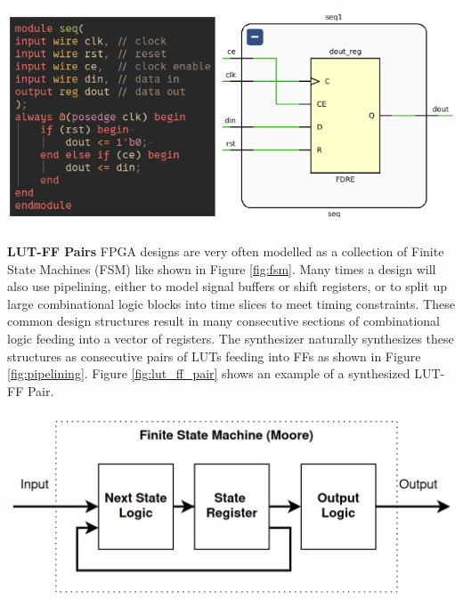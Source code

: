 \documentclass{article}
\begin{document}
\begin{multicols}{2}
        {
            \centering
            \includegraphics[width=\columnwidth]{figures/ff_synthesis.png}
            \label{fig:ff_synthesis}
        }

    \textbf{LUT-FF Pairs} \quad
        FPGA designs are very often modelled as a collection of Finite State Machines (FSM) like shown in Figure \ref{fig:fsm}.
        Many times a design will also use pipelining, either to model signal buffers or shift registers, or to split up large combinational logic blocks into time slices to meet timing constraints. 
        These common design structures result in many consecutive sections of combinational logic feeding into a vector of registers. 
        The synthesizer naturally synthesizes these structures as consecutive pairs of LUTs feeding into FFs as shown in Figure \ref{fig:pipelining}. 
        Figure \ref{fig:lut_ff_pair} shows an example of a synthesized LUT-FF Pair. 

        {
            \centering
            \includegraphics[width=\columnwidth]{figures/fsm.png}
            \label{fig:fsm}
        }


\end{multicols}
\end{document}
